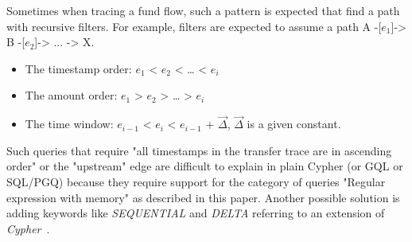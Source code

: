 
Sometimes when tracing a fund flow, such a pattern is expected that find a path
with recursive filters. For example, filters are expected to assume a path A
-[${e_1}$]-> B -[${e_2}$]-> ... -> X.

\begin{itemize}
    \item The timestamp order: ${e_1}$ < ${e_2}$ < … < ${e_i}$
    \item The amount order: ${e_1}$ > ${e_2}$ > … > ${e_i}$
    \item The time window: ${e_{i-1}}$ < ${e_i}$ < ${e_{i-1}}$ + $\vec{\Delta}$,
    $\vec{\Delta}$ is a given constant.
\end{itemize}

Such queries that require "all timestamps in the transfer trace are in ascending order" or the "upstream" edge are
difficult to explain in plain Cypher (or GQL or SQL/PGQ) because they require support for the category of queries
"Regular expression with memory" as described in this paper\cite{10.1145/2274576.2274585}. Another possible solution is
adding keywords like \emph{SEQUENTIAL} and \emph{DELTA} referring to an extension of \emph{Cypher}~\cite{tcypher}. 


